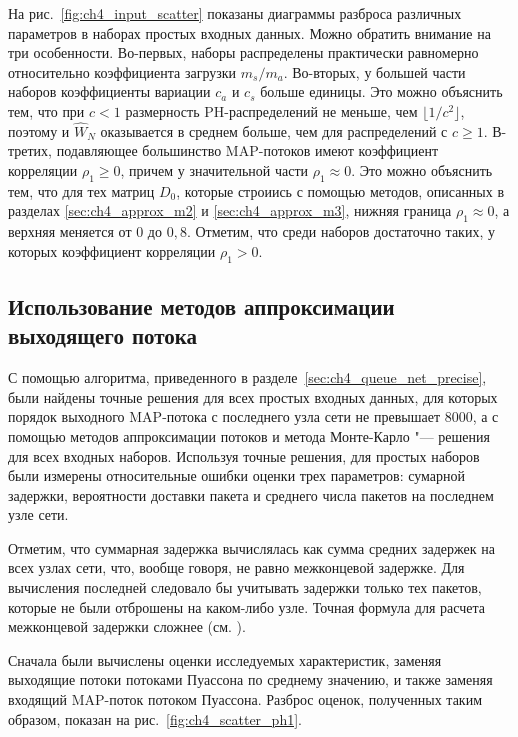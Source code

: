 На рис.~\ref{fig:ch4_input_scatter} показаны диаграммы разброса различных параметров в наборах простых входных данных. Можно обратить внимание на три особенности. Во-первых, наборы распределены практически равномерно относительно коэффициента загрузки $m_s / m_a$. Во-вторых, у большей части наборов коэффициенты вариации $c_a$ и $c_s$ больше единицы. Это можно объяснить тем, что при $c < 1$ размерность PH-распределений не меньше, чем $\lfloor 1/c^2 \rfloor$, поэтому и $\hat{W}_N$ оказывается в среднем больше, чем для распределений с $c \geqslant 1$. В-третих, подавляющее большинство MAP-потоков имеют коэффициент корреляции $\rho_1 \geqslant 0$, причем у значительной части $\rho_1 \approx 0$. Это можно объяснить тем, что для тех матриц $D_0$, которые строиись с помощью методов, описанных в разделах \ref{sec:ch4_approx_m2} и \ref{sec:ch4_approx_m3}, нижняя граница $\rho_1 \approx 0$, а верхняя меняется от 0 до $0,8$. Отметим, что среди наборов достаточно таких, у которых коэффициент корреляции $\rho_1 > 0$.



\subsection{Использование методов аппроксимации выходящего потока}

С помощью алгоритма, приведенного в разделе~\ref{sec:ch4_queue_net_precise}, были найдены точные решения для всех простых входных данных, для которых порядок выходного MAP-потока с последнего узла сети не превышает 8000, а с помощью методов аппроксимации потоков и метода Монте-Карло "--- решения для всех входных наборов. Используя точные решения, для простых наборов были измерены относительные ошибки оценки трех параметров: сумарной задержки, вероятности доставки пакета и среднего числа пакетов на последнем узле сети.

Отметим, что суммарная задержка вычислялась как сумма средних задержек на всех узлах сети, что, вообще говоря, не равно межконцевой задержке. Для вычисления последней следовало бы учитывать задержки только тех пакетов, которые не были отброшены на каком-либо узле. Точная формула для расчета межконцевой задержки сложнее (см. \cite[p.~429]{VishnevskyDudin2018}).

Сначала были вычислены оценки исследуемых характеристик, заменяя выходящие потоки потоками Пуассона по среднему значению, и также заменяя входящий MAP-поток потоком Пуассона. Разброс оценок, полученных таким образом, показан на рис.~\ref{fig:ch4_scatter_ph1}.

